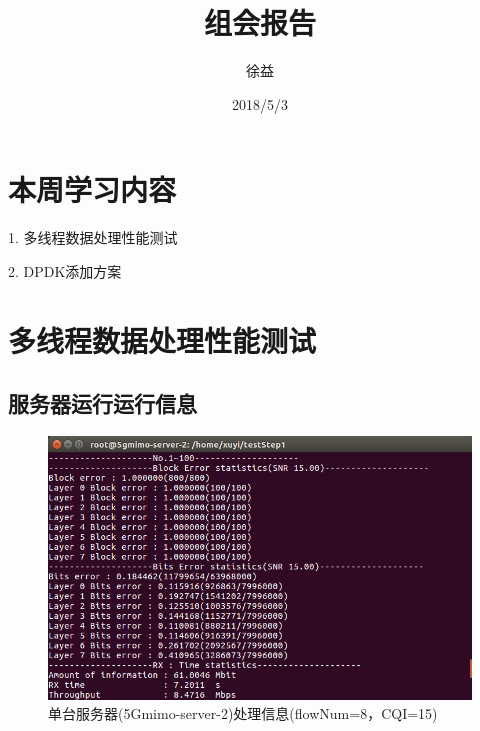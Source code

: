 \documentclass{article}
\title{组会报告}
\author{徐益}
\date{2018/5/3}
\begin{document}
	
\maketitle


\section{本周学习内容}

1. 多线程数据处理性能测试

2. DPDK添加方案

\section{多线程数据处理性能测试}

\subsection{服务器运行运行信息}
\begin{figure}[H]
	\centering
	\includegraphics[width = .8\textwidth]{result_server.png}
	\caption{单台服务器(5Gmimo-server-2)处理信息(flowNum=8，CQI=15)}
\end{figure}
\end{document}
